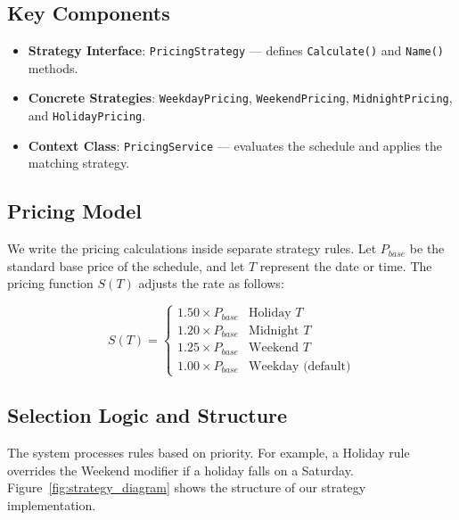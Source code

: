 \documentclass[conference]{IEEEtran}
\begin{document}
\subsection{Key Components}

\begin{itemize}
  \item \textbf{Strategy Interface}: \texttt{PricingStrategy} --- defines \texttt{Calculate()} and \texttt{Name()} methods.
  \item \textbf{Concrete Strategies}: \texttt{WeekdayPricing}, \texttt{WeekendPricing}, \texttt{MidnightPricing}, and \texttt{HolidayPricing}.
  \item \textbf{Context Class}: \texttt{PricingService} --- evaluates the schedule and applies the matching strategy.
\end{itemize}

\subsection{Pricing Model}

We write the pricing calculations inside separate strategy rules. Let $P_{base}$ be the standard base price of the schedule, and let $T$ represent the date or time. The pricing function $S(T)$ adjusts the rate as follows:

\begin{equation}
S(T) =
\begin{cases}
1.50 \times P_{base} & \text{Holiday } T \\
1.20 \times P_{base} & \text{Midnight } T \\
1.25 \times P_{base} & \text{Weekend } T \\
1.00 \times P_{base} & \text{Weekday (default)}
\end{cases}
\end{equation}

\subsection{Selection Logic and Structure}

The system processes rules based on priority. For example, a Holiday rule overrides the Weekend modifier if a holiday falls on a Saturday. Figure~\ref{fig:strategy_diagram} shows the structure of our strategy implementation.
\end{document}

